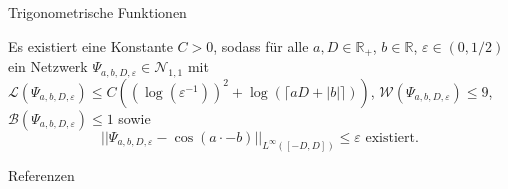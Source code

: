 \documentclass[10pt,aspectratio=169]{beamer}
\newcommand{\R}{\mathbb{R}} %
\begin{document}
\begin{frame}{Trigonometrische Funktionen}
    \begin{corollary} %
        \newcommand{\Psia}{\Psi_{a,b,D,\varepsilon}}
        Es existiert eine Konstante \(C>0\), sodass für alle \(a,D\in \R_+\), \(b\in \R\), \(\varepsilon \in (0,1/2)\) 
        ein Netzwerk \(\Psia \in \mathcal{N}_{1,1} \) mit 
        \(\mathcal{L}(\Psia) \leq C((\log(\varepsilon^{-1}))^2 + \log(\lceil a D + |b| \rceil))\), 
        \(\mathcal{W}(\Psia) \leq 9\), \(\mathcal{B}(\Psia) \leq 1\) sowie 
        \[ ||\Psia - \cos(a \cdot - b) ||_{L^\infty([-D,D])} \leq \varepsilon \text{ existiert}. \]
    \end{corollary}
\end{frame}

\begin{frame}{Referenzen}
    \footnotesize
    \printbibliography[heading=none]
\end{frame}
\end{document}
